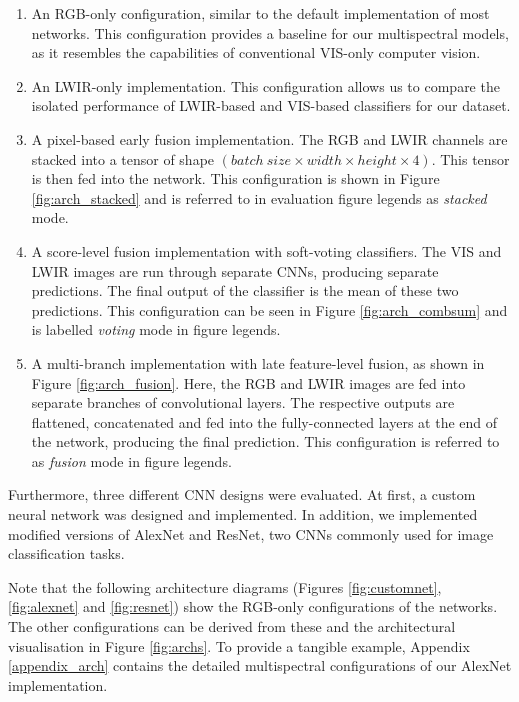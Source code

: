 \documentclass{l4proj}
\begin{document}
\begin{enumerate}
  \item An RGB-only configuration, similar to the default implementation of most networks. This configuration provides a baseline for our multispectral models, as it resembles the capabilities of conventional VIS-only computer vision.
  \item An LWIR-only implementation. This configuration allows us to compare the isolated performance of LWIR-based and VIS-based classifiers for our dataset.
  \item A pixel-based early fusion implementation. The RGB and LWIR channels are stacked into a tensor of shape $({batch\ size} \times width \times height \times 4)$. This tensor is then fed into the network. This configuration is shown in Figure \ref{fig:arch_stacked} and is referred to in evaluation figure legends as \textit{stacked} mode.
  \item A score-level fusion implementation with soft-voting classifiers. The VIS and LWIR images are run through separate CNNs, producing separate predictions. The final output of the classifier is the mean of these two predictions. This configuration can be seen in Figure \ref{fig:arch_combsum} and is labelled \textit{voting} mode in figure legends.
  \item A multi-branch implementation with late feature-level fusion, as shown in Figure \ref{fig:arch_fusion}. Here, the RGB and LWIR images are fed into separate branches of convolutional layers. The respective outputs are flattened, concatenated and fed into the fully-connected layers at the end of the network, producing the final prediction. This configuration is referred to as \textit{fusion} mode in figure legends.
\end{enumerate}

Furthermore, three different CNN designs were evaluated. At first, a custom neural network was designed and implemented. In addition, we implemented modified versions of AlexNet and ResNet, two CNNs commonly used for image classification tasks. 

Note that the following architecture diagrams (Figures \ref{fig:customnet}, \ref{fig:alexnet} and \ref{fig:resnet}) show the RGB-only configurations of the networks. The other configurations can be derived from these and the architectural visualisation in Figure \ref{fig:archs}. To provide a tangible example, Appendix \ref{appendix_arch} contains the detailed multispectral configurations of our AlexNet implementation.
\end{document}
